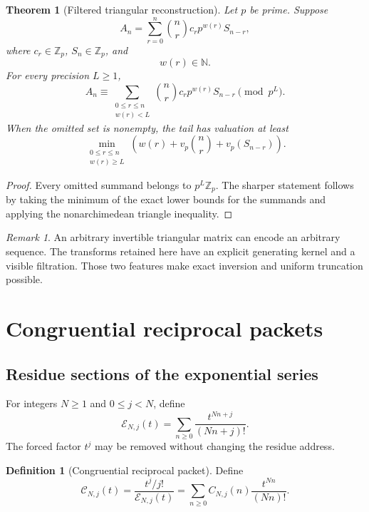 \documentclass{aomart}
\newtheorem{theorem}{Theorem}[section]
\theoremstyle{definition}
\newtheorem{definition}[definition]{Definition}
\theoremstyle{remark}
\newtheorem{remark}[remark]{Remark}
\newcommand{\NN}{\mathbb N}
\newcommand{\Zp}{\mathbb Z_p}
\newcommand{\Ecal}{\mathcal E}
\newcommand{\Ccal}{\mathcal C}
\newcommand{\vp}{v_p}
\begin{document}
\begin{theorem}[Filtered triangular reconstruction]\label{thm:filtered_triangular_reconstruction}
Let \(p\) be prime. Suppose
\[
A_n
=
\sum_{r=0}^{n}
\binom nr
c_rp^{w(r)}S_{n-r},
\]
where \(c_r\in\Zp\), \(S_n\in\Zp\), and
\[
w(r)\in\NN.
\]
For every precision \(L\geq1\),
\[
\boxed{
A_n
\equiv
\sum_{\substack{0\leq r\leq n\\w(r)<L}}
\binom nr
c_rp^{w(r)}S_{n-r}
\pmod {p^L}.
}
\]
When the omitted set is nonempty, the tail has valuation at least
\[
\boxed{
\min_{\substack{0\leq r\leq n\\w(r)\geq L}}
\left(
w(r)+\vp\binom nr+\vp(S_{n-r})
\right).
}
\]
\end{theorem}

\begin{proof}
Every omitted summand belongs to \(p^L\Zp\). The sharper statement follows by taking the minimum of the exact lower bounds for the summands and applying the nonarchimedean triangle inequality.
\end{proof}

\begin{remark}\label{rem:triangular_freedom}
An arbitrary invertible triangular matrix can encode an arbitrary sequence. The transforms retained here have an explicit generating kernel and a visible filtration. Those two features make exact inversion and uniform truncation possible.
\end{remark}

\section{Congruential reciprocal packets}\label{sec:congruential}

\subsection{Residue sections of the exponential series}

For integers \(N\geq1\) and \(0\leq j<N\), define
\[
\Ecal_{N,j}(t)
=
\sum_{n\geq0}
\frac{t^{Nn+j}}{(Nn+j)!}.
\]
The forced factor \(t^j\) may be removed without changing the residue address.

\begin{definition}[Congruential reciprocal packet]\label{def:congruential_packet}
Define
\[
\boxed{
\Ccal_{N,j}(t)
=
\frac{t^j/j!}{\Ecal_{N,j}(t)}
=
\sum_{n\geq0}
C_{N,j}(n)
\frac{t^{Nn}}{(Nn)!}.
}
\]
\end{definition}
\end{document}
